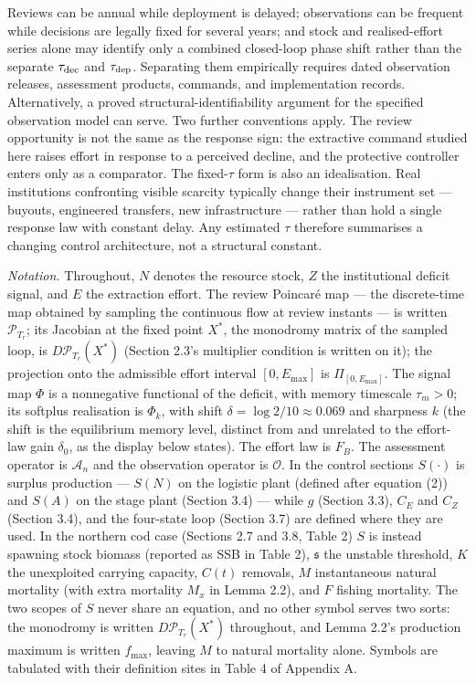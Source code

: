 \documentclass[11pt]{article}
\begin{document}
Reviews can be annual while deployment
is delayed; observations can be frequent while decisions are legally
fixed for several years; and stock and realised-effort series alone may
identify only a combined closed-loop phase shift rather than the
separate \(\tau_{\rm dec}\) and \(\tau_{\rm dep}\). Separating them
empirically requires dated observation releases, assessment products,
commands, and implementation records. Alternatively, a proved
structural-identifiability argument for the specified observation model
can serve. Two further conventions apply. The review
opportunity is not the same as the response sign: the extractive command
studied here raises effort in response to a perceived decline, and the
protective controller enters only as a comparator. The fixed-\(\tau\)
form is also an idealisation. Real institutions confronting visible
scarcity typically change their instrument set --- buyouts, engineered
transfers, new infrastructure --- rather than hold a single response law
with constant delay. Any estimated \(\tau\) therefore summarises a
changing control architecture, not a structural constant.

\emph{Notation.} Throughout, \(N\) denotes the resource stock, \(Z\) the
institutional deficit signal, and \(E\) the extraction effort. The
review Poincar\'e map --- the discrete-time map obtained by sampling the
continuous flow at review instants --- is written \(\mathcal P_{T_r}\);
its Jacobian at the fixed point \(X^*\), the monodromy matrix of the
sampled loop, is \(D\mathcal P_{T_r}(X^*)\) (Section 2.3's multiplier
condition is written on it); the projection onto the admissible effort
interval \([0,E_{\max}]\) is \(\Pi_{[0,E_{\max}]}\). The signal map
\(\Phi\) is a nonnegative functional of the deficit, with memory
timescale \(\tau_m>0\); its softplus realisation is \(\Phi_k\), with
shift \(\delta = \log 2/10 \approx 0.069\) and sharpness \(k\) (the shift is the equilibrium memory level, distinct from and unrelated to the effort-law
gain \(\delta_0\), as the display below states). The effort law is
\(F_B\). The assessment operator is \(\mathcal A_n\) and the observation
operator is \(\mathcal O\). In the control sections \(S(\cdot)\) is
surplus production --- \(S(N)\) on the logistic plant (defined after equation (2)) and
\(S(A)\) on the stage plant (Section 3.4) --- while \(g\) (Section 3.3),
\(C_E\) and \(C_Z\) (Section 3.4), and the four-state loop (Section 3.7)
are defined where they are used. In the northern cod case (Sections 2.7
and 3.8, Table 2) \(S\) is instead spawning stock biomass (reported as
SSB in Table 2), \(\mathfrak s\) the unstable threshold, \(K\) the
unexploited carrying capacity, \(C(t)\) removals, \(M\) instantaneous
natural mortality (with extra mortality \(M_x\) in Lemma 2.2), and \(F\)
fishing mortality. The two scopes of \(S\) never share an equation, and
no other symbol serves two sorts: the monodromy is written
\(D\mathcal P_{T_r}(X^*)\) throughout, and Lemma 2.2's production
maximum is written \(f_{\max}\), leaving \(M\) to natural mortality
alone. Symbols are tabulated with their definition sites in Table 4 of
Appendix A.
\end{document}
